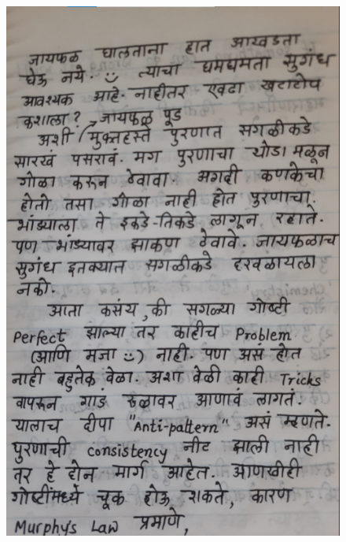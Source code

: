 \documentclass[17pt]{extarticle}  %
\begin{document}
\begin{figure}[h!]
    \centering
    \includegraphics{img/05-s.png}
\end{figure}
\end{document}
